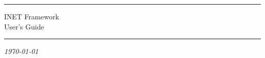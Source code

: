 

\begin{center}\end{center}
\vspace{16em}
\hrule
\vspace{2em}
\begin{center}
{\HUGE INET Framework}\\
\vspace{2em}
{\Huge User's Guide}\\
\end{center}
\vspace{2em}
\hrule

\begin{center}
\textit{\today}
\end{center}



